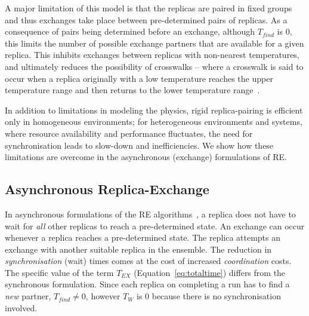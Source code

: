 \documentclass{rspublic}
\begin{document}
A major limitation of this model is that the replicas are paired in fixed
groups and thus exchanges take place between pre-determined pairs of
replicas.  As a consequence of pairs being determined before an
exchange, although $T_{find}$ is $0$, this limits the number of possible
exchange partners that are available for a given replica. This
inhibits exchanges between replicas with non-nearest temperatures, and
ultimately reduces the possibility of crosswalks -- where a crosswalk
is said to occur when a replica originally with a low temperature
reaches the upper temperature range and then returns to the lower
temperature range~\citep{parashar_arepex}.


In addition to limitations in modeling the physics, rigid
replica-pairing is efficient only in homogeneous environments; for
heterogeneous environments and systems, where resource availability and
performance fluctuates, the need for synchronisation leads to
slow-down and inefficiencies. We show how these limitations are
overcome in the asynchronous (exchange) formulations of RE.

\subsection{Asynchronous Replica-Exchange}


In asynchronous formulations of the RE
algorithms~\citep{parashar_arepex,DBLP:journals/jcc/GallicchioLP08}, a
replica does not have to wait for {\it all} other replicas to reach a
pre-determined state. An exchange can occur whenever a replica reaches a
pre-determined state. The replica attempts an exchange with another
suitable replica in the ensemble.  The reduction in {\it
  synchronisation} (wait) times comes at the cost of increased {\it
  coordination} costs.  The specific value of the term $T_{EX}$
(Equation~\ref{eq:totaltime}) differs from the synchronous formulation.
Since each replica on completing a run has to find a {\it new}
partner, $T_{find} \neq 0$, however $T_W$ is 0 because there is no
synchronisation involved. %
\end{document}

